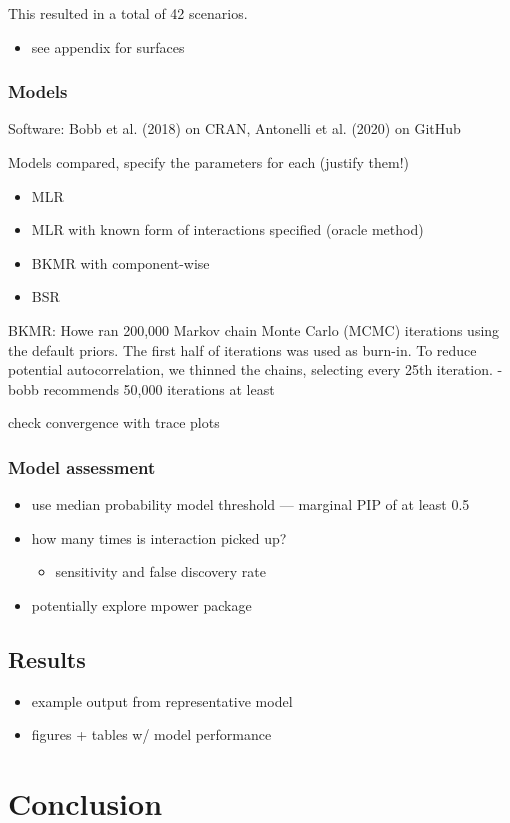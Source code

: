 \documentclass[12pt, twoside]{amherstthesis}
\providecommand{\tightlist}{%
  \setlength{\itemsep}{0pt}\setlength{\parskip}{0pt}}
\begin{document}
This resulted in a total of 42 scenarios.
\begin{itemize}
\tightlist
\item
  see appendix for surfaces
\end{itemize}
\hypertarget{models}{%
\subsection{Models}\label{models}}

Software: Bobb et al. (2018) on CRAN, Antonelli et al. (2020) on GitHub

Models compared, specify the parameters for each (justify them!)
\begin{itemize}
\tightlist
\item
  MLR
\item
  MLR with known form of interactions specified (oracle method)
\item
  BKMR with component-wise
\item
  BSR
\end{itemize}
BKMR:
Howe ran 200,000 Markov chain Monte Carlo (MCMC) iterations using the default priors. The first half of iterations was used as burn-in. To reduce potential autocorrelation, we thinned the chains, selecting every 25th iteration.
- bobb recommends 50,000 iterations at least

check convergence with trace plots

\hypertarget{model-assessment}{%
\subsection{Model assessment}\label{model-assessment}}
\begin{itemize}
\tightlist
\item
  use median probability model threshold --- marginal PIP of at least 0.5
\item
  how many times is interaction picked up?
  \begin{itemize}
  \tightlist
  \item
    sensitivity and false discovery rate
  \end{itemize}
\item
  potentially explore mpower package
\end{itemize}
\hypertarget{results}{%
\section{Results}\label{results}}
\begin{itemize}
\tightlist
\item
  example output from representative model
\item
  figures + tables w/ model performance
\end{itemize}
\hypertarget{conclusion}{%
\chapter*{Conclusion}\label{conclusion}}
\end{document}
